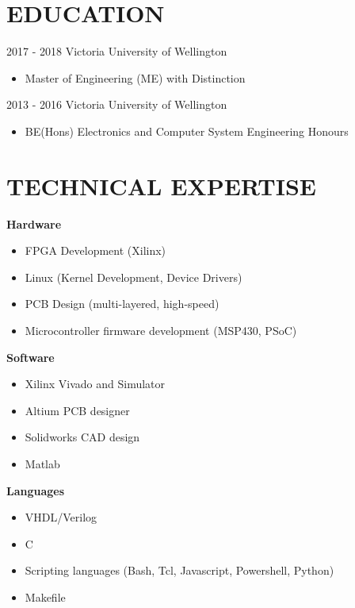 \documentclass[3pt]{res}
\begin{document}
\begin{resume}
\section{EDUCATION}
\vspace{0.1in}

  2017 - 2018 Victoria University of Wellington
  \begin{itemize}
    \item Master of Engineering (ME) with Distinction
  \end{itemize}

  2013 - 2016 Victoria University of Wellington
  \begin{itemize} %
    \item BE(Hons) Electronics and Computer System Engineering Honours
  \end{itemize}

\section{TECHNICAL EXPERTISE}
  {\bf Hardware}
    \begin{itemize}[noitemsep]
      \item FPGA Development (Xilinx)
      \item Linux (Kernel Development, Device Drivers)
      \item PCB Design (multi-layered, high-speed)
      \item Microcontroller firmware development (MSP430, PSoC)
    \end{itemize}

  \newpage

  {\bf Software}
    \begin{itemize}[noitemsep]
      \item Xilinx Vivado and Simulator
      \item Altium PCB designer
      \item Solidworks CAD design
      \item Matlab
    \end{itemize}

  {\bf Languages}
    \begin{itemize}[noitemsep]
      \item VHDL/Verilog
      \item C
      \item Scripting languages (Bash, Tcl, Javascript, Powershell, Python)
      \item Makefile
    \end{itemize}


\end{resume}
\end{document}
